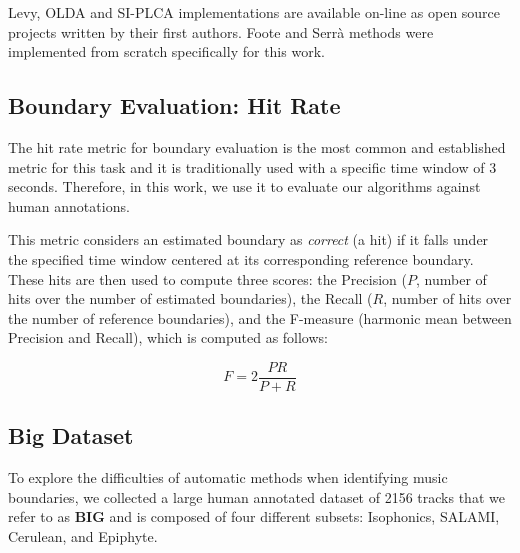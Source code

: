 \documentclass{article}
\begin{document}
Levy, OLDA and SI-PLCA implementations are available on-line as open source projects written by their first authors.
Foote and Serr\`a methods were implemented from scratch specifically for this work.

\subsection{Boundary Evaluation: Hit Rate}\label{subsec:hitrate}

The hit rate metric for boundary evaluation is the most common and established metric for this task and it is traditionally used with a specific time window of 3 seconds\cite{Ong2005}. 
Therefore, in this work, we use it to evaluate our algorithms against human annotations.

This metric considers an estimated boundary as \emph{correct} (a hit) if it falls under the specified time window centered at its corresponding reference boundary.
These hits are then used to compute three scores: the Precision ($P$, number of hits over the number of estimated boundaries), the Recall ($R$, number of hits over the number of reference boundaries), and the F-measure (harmonic mean between Precision and Recall), which is computed as follows:

\begin{equation}\label{eq:fmeasure}
  F = 2 \frac{P R}{P + R}
\end{equation}

\subsection{Big Dataset}

To explore the difficulties of automatic methods when identifying music boundaries, we collected a large human annotated dataset of 2156 tracks that we refer to as \textbf{BIG} and is composed of four different subsets: Isophonics, SALAMI, Cerulean, and Epiphyte.
\end{document}
